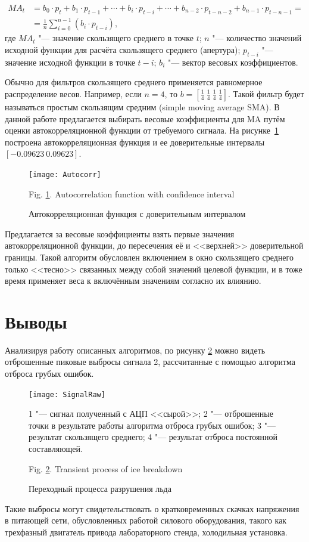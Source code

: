 \begin{equation}
	\begin{aligned}
		MA_t &= b_0 \cdot p_t+b_1 \cdot p_{t-1}+\cdots+b_i \cdot p_{t-i}+\cdots+b_{n-2} \cdot p_{t-n-2}+b_{n-1} \cdot p_{t-n-1} = \\
		&= \frac{1}{n}\sum_{i=0}^{n-1}\left( b_i \cdot p_{t-i}\right),
	\end{aligned}
\end{equation}
где $ MA_t $ "--- значение скользящего среднего в точке $ t $; $ n $ "--- количество значений исходной функции для расчёта скользящего среднего (апертура); $ p_{t-i} $ "--- значение исходной функции в точке $ t-i $; $ b_i $ "--- вектор весовых коэффициентов.

Обычно для фильтров скользящего среднего применяется равномерное распределение весов. Например, если $ n = 4 $, то $ b = \left[ \frac{1}{4}\ \frac{1}{4}\ \frac{1}{4}\ \frac{1}{4}\right] $. Такой фильтр будет называться простым скользящим средним (simple moving average SMA).
В данной работе предлагается выбирать весовые коэффициенты для MA путём оценки автокорреляционной функции от требуемого сигнала. На рисунке~\ref{fig:Autocorr} построена автокорреляционная функция и ее доверительные интервалы $ [-0.09623\ 0.09623] $.
\begin{figure}[!ht] 
	\centering
	\texttt{[image: Autocorr]}%
	\caption{Автокорреляционная функция с доверительным интервалом} 
	\label{fig:Autocorr} 
	Fig. \ref{fig:Autocorr}. Autocorrelation function with confidence interval
\end{figure}
Предлагается за весовые коэффициенты взять первые значения автокорреляционной функции, до пересечения её и <<верхней>> доверительной границы.
Такой алгоритм обусловлен включением в окно скользящего среднего только <<тесно>> связанных между собой значений целевой функции, и в тоже время применяет веса к включённым значениям согласно их влиянию.

\section{Выводы}

Анализируя работу описанных алгоритмов, по рисунку \ref{fig:SignalRaw} можно видеть отброшенные пиковые выбросы сигнала 2, рассчитанные с помощью алгоритма отброса грубых ошибок.
\begin{figure}[!ht] 
	\centering
	\texttt{[image: SignalRaw]}%
	
	1 "--- сигнал полученный с АЦП <<сырой>>; 2 "--- отброшенные точки в результате работы алгоритма отброса грубых ошибок; 3 "--- результат скользящего среднего; 4 "--- результат отброса постоянной составляющей.
	\caption{Переходный процесса разрушения льда} 
	\label{fig:SignalRaw} 
	Fig. \ref{fig:SignalRaw}. Transient process of ice breakdown
\end{figure}
Такие выбросы могут свидетельствовать о кратковременных скачках напряжения в питающей сети, обусловленных работой силового оборудования, такого как трехфазный двигатель привода лабораторного стенда, холодильная установка.

